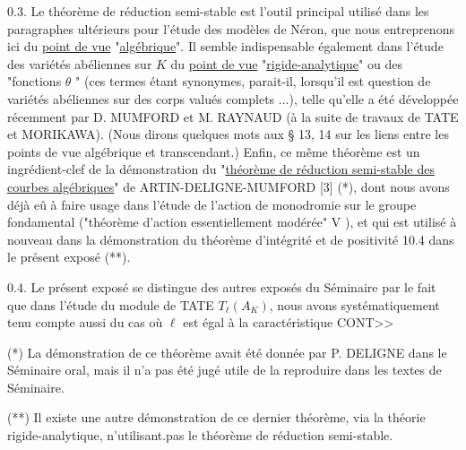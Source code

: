 0.3.  Le théorème de réduction semi-stable est l'outil principal utilisé dans les paragraphes ultérieurs pour l'étude des modèles de Néron, que nous entreprenons ici du \underline{point de vue} "\underline{algébrique}". Il semble indispensable également dans l'étude des variétés abéliennes sur $K$ du \underline{point de vue} "\underline{rigide-analytique}" ou des "fonctions $\theta$ " (ces termes étant synonymes, parait-il, lorsqu'il est question de variétés abéliennes sur des corps valués complets ...), telle qu'elle a été développée récemment par D. MUMFORD et M. RAYNAUD (à la suite de travaux de TATE et MORIKAWA). (Nous dirons quelques mots aux \S{} 13, 14 sur les liens entre les points de vue algébrique et transcendant.) Enfin, ce même théorème est un ingrédient-clef de la démonstration du "\underline{théorème de réduction semi-stable des courbes algébriques}" de ARTIN-DELIGNE-MUMFORD [3] (*), dont nous avons déjà eû à faire usage dans l'étude de l'action de monodromie sur le groupe fondamental ("théorème d'action essentiellement modérée" V \hspace{2em}), et qui est utilisé à nouveau dans la démonstration du théorème d'intégrité et de positivité 10.4 dans le présent exposé (**).

0.4.  Le présent exposé se distingue des autres exposés du Séminaire par le fait que dans l'étude du module de TATE $T_\ell(A_K)$, nous avons systématiquement tenu compte aussi du cas où $\ell$ est égal à la caractéristique CONT>>

(*)  La démonstration de ce théorème avait été donnée par P. DELIGNE dans le Séminaire oral, mais il n'a pas été jugé utile de la reproduire dans les textes de Séminaire.

(**) Il existe une autre démonstration de ce dernier théorème, via la théorie rigide-analytique, n'utilisant.pas le théorème de réduction semi-stable.



